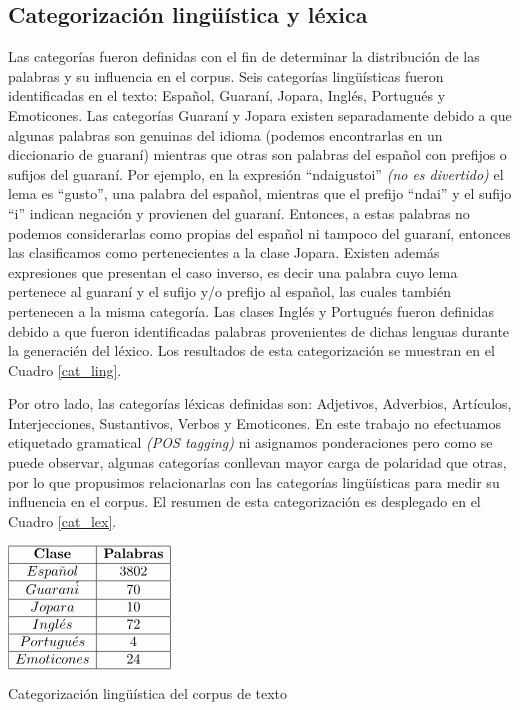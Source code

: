 \subsection{Categorizaci\'on ling\"u\'istica y l\'exica}

Las categor\'ias fueron definidas con el fin de determinar la distribuci\'on de las palabras y su influencia en el corpus. Seis categor\'ias ling\"u\'isticas fueron identificadas en el texto: Espa\~nol, Guaran\'i, Jopara, Ingl\'es, Portugu\'es y Emoticones. Las categor\'ias Guaran\'i y Jopara existen separadamente debido a que algunas palabras son genuinas del idioma (podemos encontrarlas en un diccionario de guaran\'i) mientras que otras son palabras del espa\~nol con prefijos o sufijos del guaran\'i. Por ejemplo, en la expresi\'on ``ndaigustoi'' \textit{(no es divertido)} el lema es ``gusto'', una palabra del espa\~nol, mientras que el prefijo ``ndai'' y el sufijo ``i'' indican negaci\'on y provienen del guaran\'i. Entonces, a estas palabras no podemos considerarlas como propias del espa\~nol ni tampoco del guaran\'i, entonces las clasificamos como pertenecientes a la clase Jopara. Existen adem\'as expresiones que presentan el caso inverso, es decir una palabra cuyo lema pertenece al guaran\'i y el sufijo y/o prefijo al espa\~nol, las cuales tambi\'en pertenecen a la misma categor\'ia. Las clases Ingl\'es y Portugu\'es fueron definidas debido a que fueron identificadas palabras provenientes de dichas lenguas durante la generaci\'en del l\'exico. Los resultados de esta categorizaci\'on se muestran en el Cuadro \ref{cat_ling}.
\newline

Por otro lado, las categor\'ias l\'exicas definidas son: Adjetivos, Adverbios, Art\'iculos, Interjecciones, Sustantivos, Verbos y Emoticones. En este trabajo no efectuamos etiquetado gramatical \textit{(POS tagging)} ni asignamos ponderaciones pero como se puede observar,  algunas categor\'ias conllevan mayor carga de polaridad que otras, por lo que propusimos relacionarlas con las categor\'ias ling\"u\'isticas para medir su influencia en el corpus. El resumen de esta categorizaci\'on es desplegado en el Cuadro \ref{cat_lex}.
\newline

\begin{table}[htb] 
\centering

$
\begin{array}{|c|c|}
      \hline
      \mathbf{Clase}  	& \mathbf{Palabras}	\\
      \hline
      Espa\tilde{n}ol 	& 3802				\\
      \hline
      Guaran\acute{i} 	& 70 				\\
      \hline
      Jopara			& 10				\\
      \hline
      Ingl\acute{e}s	& 72				\\
      \hline
      Portugu\acute{e}s	& 4					\\
      \hline
      Emoticones		& 24				\\
      \hline
\end{array}
$
\caption{Categorizaci\'on ling\"u\'istica del corpus de texto}
\label{cat_ling}
\end{table}

